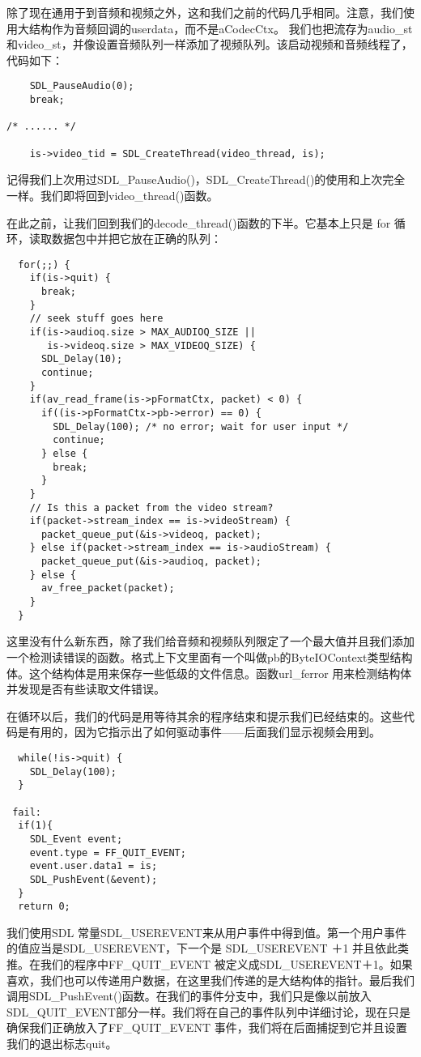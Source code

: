 除了现在通用于到音频和视频之外，这和我们之前的代码几乎相同。注意，我们使用大结构作为音频回调的userdata，而不是aCodecCtx。 我们也把流存为audio_st和video_st，并像设置音频队列一样添加了视频队列。该启动视频和音频线程了，代码如下：


\begin{lstlisting}
    SDL_PauseAudio(0);
    break;

/* ...... */

    is->video_tid = SDL_CreateThread(video_thread, is);
\end{lstlisting}

记得我们上次用过SDL_PauseAudio()，SDL_CreateThread()的使用和上次完全一样。我们即将回到video_thread()函数。

在此之前，让我们回到我们的decode_thread()函数的下半。它基本上只是 for 循环，读取数据包中并把它放在正确的队列：
\begin{lstlisting}
  for(;;) {
    if(is->quit) {
      break;
    }
    // seek stuff goes here
    if(is->audioq.size > MAX_AUDIOQ_SIZE ||
       is->videoq.size > MAX_VIDEOQ_SIZE) {
      SDL_Delay(10);
      continue;
    }
    if(av_read_frame(is->pFormatCtx, packet) < 0) {
      if((is->pFormatCtx->pb->error) == 0) {
        SDL_Delay(100); /* no error; wait for user input */
        continue;
      } else {
        break;
      }
    }
    // Is this a packet from the video stream?
    if(packet->stream_index == is->videoStream) {
      packet_queue_put(&is->videoq, packet);
    } else if(packet->stream_index == is->audioStream) {
      packet_queue_put(&is->audioq, packet);
    } else {
      av_free_packet(packet);
    }
  }
\end{lstlisting}

这里没有什么新东西，除了我们给音频和视频队列限定了一个最大值并且我们添加一个检测读错误的函数。格式上下文里面有一个叫做pb的ByteIOContext类型结构体。这个结构体是用来保存一些低级的文件信息。函数url_ferror 用来检测结构体并发现是否有些读取文件错误。

在循环以后，我们的代码是用等待其余的程序结束和提示我们已经结束的。这些代码是有用的，因为它指示出了如何驱动事件——后面我们显示视频会用到。
\begin{lstlisting}
  while(!is->quit) {
    SDL_Delay(100);
  }

 fail:
  if(1){
    SDL_Event event;
    event.type = FF_QUIT_EVENT;
    event.user.data1 = is;
    SDL_PushEvent(&event);
  }
  return 0;
\end{lstlisting}

我们使用SDL 常量SDL_USEREVENT来从用户事件中得到值。第一个用户事件的值应当是SDL_USEREVENT，下一个是 SDL_USEREVENT ＋1 并且依此类推。在我们的程序中FF_QUIT_EVENT 被定义成SDL_USEREVENT＋1。如果喜欢，我们也可以传递用户数据，在这里我们传递的是大结构体的指针。最后我们调用SDL_PushEvent()函数。在我们的事件分支中，我们只是像以前放入SDL_QUIT_EVENT部分一样。我们将在自己的事件队列中详细讨论，现在只是确保我们正确放入了FF_QUIT_EVENT 事件，我们将在后面捕捉到它并且设置我们的退出标志quit。

